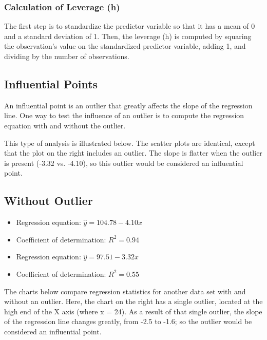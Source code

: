 \documentclass[residuals.tex]{subfiles}
\begin{document}
\subsubsection{Calculation of Leverage (h)}
The first step is to standardize the predictor variable so that it has a mean of 0 and a standard deviation of 1. Then, the leverage (h) is computed by squaring the observation's value on the standardized predictor variable, adding 1, and dividing by the number of observations.


\subsection{Influential Points}

An influential point is an outlier that greatly affects the slope of the regression line. One way to test the influence of an outlier is to compute the regression equation with and without the outlier.

This type of analysis is illustrated below. The scatter plots are identical, except that the plot on the right includes an outlier. The slope is flatter when the outlier is present (-3.32 vs. -4.10), so this outlier would be considered an influential point.

\subsection{Without Outlier}


\begin{itemize}
\item Regression equation: $\hat{y} = 104.78 - 4.10x$
\item Coefficient of determination: $R^2 = 0.94$ 
\end{itemize}
\begin{itemize}
\item Regression equation: $\hat{y} = 97.51 - 3.32x$
\item Coefficient of determination: $R^2 = 0.55$ 
\end{itemize}

The charts below compare regression statistics for another data set with and without an outlier. Here, the chart on the right has a single outlier, located at the high end of the X axis (where x = 24). As a result of that single outlier, the slope of the regression line changes greatly, from -2.5 to -1.6; so the outlier would be considered an influential point.
\end{document}
